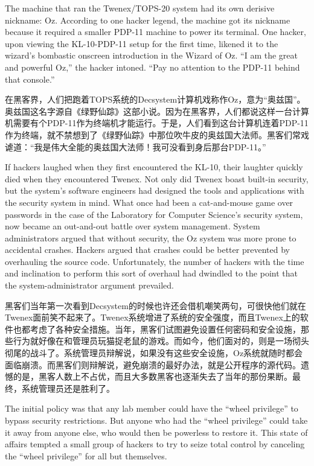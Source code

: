 \ifdefined\eng
The machine that ran the Twenex/TOPS-20 system had its own derisive nickname: Oz. According to one hacker legend, the machine got its nickname because it required a smaller PDP-11 machine to power its terminal. One hacker, upon viewing the KL-10-PDP-11 setup for the first time, likened it to the wizard's bombastic onscreen introduction in the Wizard of Oz. ``I am the great and powerful Oz,'' the hacker intoned. ``Pay no attention to the PDP-11 behind that console.''
\fi

\ifdefined\chs
在黑客界，人们把跑着TOPS系统的Decsystem计算机戏称作Oz，意为``奥兹国''。奥兹国这名字源自《绿野仙踪》这部小说。因为在黑客界，人们都说这样一台计算机需要有个PDP-11作为终端机才能运行。于是，人们看到这台计算机连着PDP-11作为终端，就不禁想到了《绿野仙踪》中那位吹牛皮的奥兹国大法师。黑客们常戏谑道：``我是伟大全能的奥兹国大法师！我可没看到身后那台PDP-11。''
\fi

\ifdefined\eng
If hackers laughed when they first encountered the KL-10, their laughter quickly died when they encountered Twenex. Not only did Twenex boast built-in security, but the system's software engineers had designed the tools and applications with the security system in mind. What once had been a cat-and-mouse game over passwords in the case of the Laboratory for Computer Science's security system, now became an out-and-out battle over system management. System administrators argued that without security, the Oz system was more prone to accidental crashes. Hackers argued that crashes could be better prevented by overhauling the source code. Unfortunately, the number of hackers with the time and inclination to perform this sort of overhaul had dwindled to the point that the system-administrator argument prevailed.
\fi

\ifdefined\chs
黑客们当年第一次看到Decsystem的时候也许还会借机嘲笑两句，可很快他们就在Twenex面前笑不起来了。Twenex系统增进了系统的安全强度，而且Twenex上的软件也都考虑了各种安全措施。当年，黑客们试图避免设置任何密码和安全设施，那些行为就好像在和管理员玩猫捉老鼠的游戏。而如今，他们面对的，则是一场彻头彻尾的战斗了。系统管理员辩解说，如果没有这些安全设施，Oz系统就随时都会面临崩溃。而黑客们则辩解说，避免崩溃的最好办法，就是公开程序的源代码。遗憾的是，黑客人数上不占优，而且大多数黑客也逐渐失去了当年的那份果断。最终，系统管理员还是胜利了。
\fi

\ifdefined\vtwo
\ifdefined\eng
The initial policy was that any lab member could have the ``wheel privilege'' to bypass security restrictions.  But anyone who had the ``wheel privilege'' could take it away from anyone else, who would then be powerless to restore it.  This state of affairs tempted a small group of hackers to try to seize total control by canceling the ``wheel privilege'' for all but themselves.
\fi

